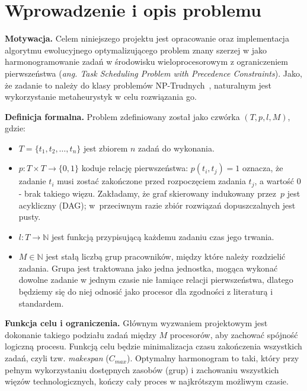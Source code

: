 \documentclass[12pt,a4paper]{article}
\begin{document}
\section{Wprowadzenie i opis problemu}
\textbf{Motywacja.} Celem niniejszego projektu jest opracowanie oraz implementacja algorytmu ewolucyjnego optymalizującego problem znany szerzej w jako harmonogramowanie zadań w środowisku wieloprocesorowym z ograniczeniem pierwszeństwa (\textit{ang. Task Scheduling Problem with Precedence Constraints}). Jako, że zadanie to należy do klasy problemów NP-Trudnych~\cite{ullman1975}, naturalnym jest wykorzystanie metaheurystyk w celu rozwiązania go.
\par\medskip\noindent
\textbf{Definicja formalna.} Problem zdefiniowany został jako czwórka $(T, p, l, M)$, gdzie:
\begin{itemize}[itemsep=3pt, topsep=3pt]
    \item $T = \{t_1, t_2, \dots, t_n\}$ jest zbiorem $n$ zadań do wykonania.
    \item $p : T \times T \to \{0, 1\}$ koduje relację pierwszeństwa: $p(t_i, t_j) = 1$ oznacza, że zadanie $t_i$ musi zostać zakończone przed rozpoczęciem zadania $t_j$, a wartość $0$ - brak takiego więzu. Zakładamy, że graf skierowany indukowany przez~$p$ jest acykliczny (DAG); w~przeciwnym razie zbiór rozwiązań dopuszczalnych jest pusty.
    \item $l: T \to \mathbb{N}$ jest funkcją przypisującą każdemu zadaniu czas jego trwania.
    \item $M \in \mathbb{N}$ jest stałą liczbą grup pracowników, między które należy rozdzielić zadania. Grupa jest traktowana jako jedna jednostka, mogąca wykonać dowolne zadanie w jednym czasie nie łamiące relacji pierwszeństwa, dlatego będziemy się do niej odnosić jako procesor dla zgodności z literaturą i standardem.
\end{itemize}
\noindent
\textbf{Funkcja celu i ograniczenia.} Głównym wyzwaniem projektowym jest dokonanie takiego podziału zadań między $M$ procesorów, aby zachować spójność logiczną procesu. Funkcją celu będzie minimalizacja czasu zakończenia wszystkich zadań, czyli tzw. \textit{makespan} ($C_{max}$). Optymalny harmonogram to taki, który przy pełnym wykorzystaniu dostępnych zasobów (grup) i zachowaniu wszystkich więzów technologicznych, kończy cały proces w najkrótszym możliwym czasie.
\end{document}
